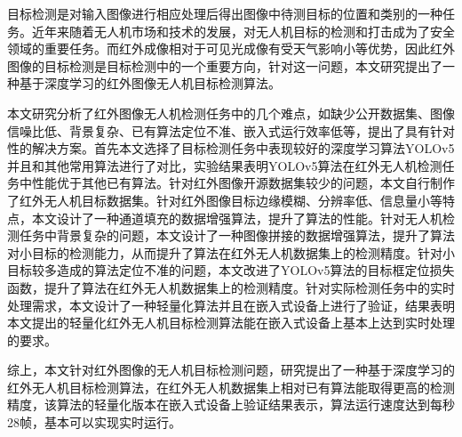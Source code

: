 \begin{cabstract}
  目标检测是对输入图像进行相应处理后得出图像中待测目标的位置和类别的一种任务。近年来随着无人机市场和技术的发展，对无人机目标的检测和打击成为了安全领域的重要任务。而红外成像相对于可见光成像有受天气影响小等优势，因此红外图像的目标检测是目标检测中的一个重要方向，针对这一问题，本文研究提出了一种基于深度学习的红外图像无人机目标检测算法。

本文研究分析了红外图像无人机检测任务中的几个难点，如缺少公开数据集、图像信噪比低、背景复杂、已有算法定位不准、嵌入式运行效率低等，提出了具有针对性的解决方案。首先本文选择了目标检测任务中表现较好的深度学习算法YOLOv5并且和其他常用算法进行了对比，实验结果表明YOLOv5算法在红外无人机检测任务中性能优于其他已有算法。针对红外图像开源数据集较少的问题，本文自行制作了红外无人机目标数据集。针对红外图像目标边缘模糊、分辨率低、信息量小等特点，本文设计了一种通道填充的数据增强算法，提升了算法的性能。针对无人机检测任务中背景复杂的问题，本文设计了一种图像拼接的数据增强算法，提升了算法对小目标的检测能力，从而提升了算法在红外无人机数据集上的检测精度。针对小目标较多造成的算法定位不准的问题，本文改进了YOLOv5算法的目标框定位损失函数，提升了算法在红外无人机数据集上的检测精度。针对实际检测任务中的实时处理需求，本文设计了一种轻量化算法并且在嵌入式设备上进行了验证，结果表明本文提出的轻量化红外无人机目标检测算法能在嵌入式设备上基本上达到实时处理的要求。

综上，本文针对红外图像的无人机目标检测问题，研究提出了一种基于深度学习的红外无人机目标检测算法，在红外无人机数据集上相对已有算法能取得更高的检测精度，该算法的轻量化版本在嵌入式设备上验证结果表示，算法运行速度达到每秒28帧，基本可以实现实时运行。
\end{cabstract}

